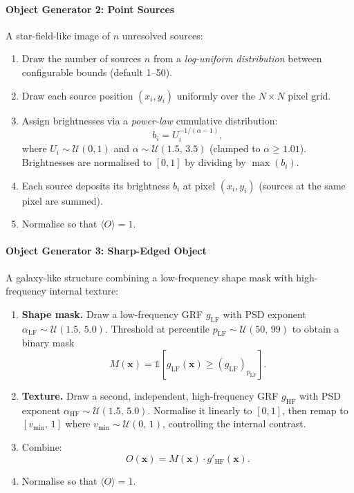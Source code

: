 \documentclass{aa}
\begin{document}
\paragraph{Object Generator 2: Point Sources}

A star-field-like image of $n$ unresolved sources:
\begin{enumerate}
    \item Draw the number of sources $n$ from a \emph{log-uniform distribution} between configurable bounds (default 1--50).
    \item Draw each source position $(x_i, y_i)$ uniformly over the $N \times N$ pixel grid.
    \item Assign brightnesses via a \emph{power-law} cumulative distribution:
    \begin{equation}
    b_i = U_i^{-1/(\alpha - 1)},
    \end{equation}
    where $U_i \sim \mathcal{U}(0,1)$ and $\alpha \sim \mathcal{U}(1.5,\,3.5)$ (clamped to $\alpha \geq 1.01$). Brightnesses are normalised to $[0,1]$ by dividing by $\max(b_i)$.
    \item Each source deposits its brightness $b_i$ at pixel $(x_i, y_i)$ (sources at the same pixel are summed).
    \item Normalise so that $\langle O \rangle = 1$.
\end{enumerate}

\paragraph{Object Generator 3: Sharp-Edged Object}

A galaxy-like structure combining a low-frequency shape mask with high-frequency internal texture:
\begin{enumerate}
    \item \textbf{Shape mask.} Draw a low-frequency GRF $g_\mathrm{LF}$ with PSD exponent $\alpha_\mathrm{LF} \sim \mathcal{U}(1.5,\,5.0)$. Threshold at percentile $p_\mathrm{LF} \sim \mathcal{U}(50,\,99)$ to obtain a binary mask
    \begin{equation}
    M(\mathbf{x}) = \mathbb{1}\!\left[g_\mathrm{LF}(\mathbf{x}) \geq (g_\mathrm{LF})_{p_\mathrm{LF}}\right].
    \end{equation}

    \item \textbf{Texture.} Draw a second, independent, high-frequency GRF $g_\mathrm{HF}$ with PSD exponent $\alpha_\mathrm{HF} \sim \mathcal{U}(1.5,\,5.0)$. Normalise it linearly to $[0,1]$, then remap to $[v_\mathrm{min},\,1]$ where $v_\mathrm{min} \sim \mathcal{U}(0,\,1)$, controlling the internal contrast.

    \item Combine:
    \begin{equation}
    O(\mathbf{x}) = M(\mathbf{x}) \cdot g'_\mathrm{HF}(\mathbf{x}).
    \end{equation}

    \item Normalise so that $\langle O \rangle = 1$.
\end{enumerate}
\end{document}
